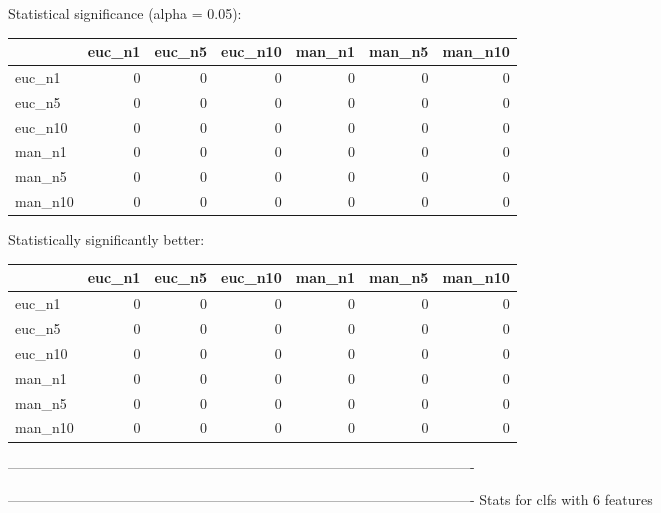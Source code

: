 Statistical significance (alpha = 0.05):
 \begin{tabular}{lrrrrrr}
\hline
         &   euc\_n1 &   euc\_n5 &   euc\_n10 &   man\_n1 &   man\_n5 &   man\_n10 \\
\hline
 euc\_n1  &        0 &        0 &         0 &        0 &        0 &         0 \\
 euc\_n5  &        0 &        0 &         0 &        0 &        0 &         0 \\
 euc\_n10 &        0 &        0 &         0 &        0 &        0 &         0 \\
 man\_n1  &        0 &        0 &         0 &        0 &        0 &         0 \\
 man\_n5  &        0 &        0 &         0 &        0 &        0 &         0 \\
 man\_n10 &        0 &        0 &         0 &        0 &        0 &         0 \\
\hline
\end{tabular} 

Statistically significantly better:
 \begin{tabular}{lrrrrrr}
\hline
         &   euc\_n1 &   euc\_n5 &   euc\_n10 &   man\_n1 &   man\_n5 &   man\_n10 \\
\hline
 euc\_n1  &        0 &        0 &         0 &        0 &        0 &         0 \\
 euc\_n5  &        0 &        0 &         0 &        0 &        0 &         0 \\
 euc\_n10 &        0 &        0 &         0 &        0 &        0 &         0 \\
 man\_n1  &        0 &        0 &         0 &        0 &        0 &         0 \\
 man\_n5  &        0 &        0 &         0 &        0 &        0 &         0 \\
 man\_n10 &        0 &        0 &         0 &        0 &        0 &         0 \\
\hline
\end{tabular} 

----------------------------------------------------------------------------------------------------



----------------------------------------------------------------------------------------------------
Stats for clfs with 6 features


